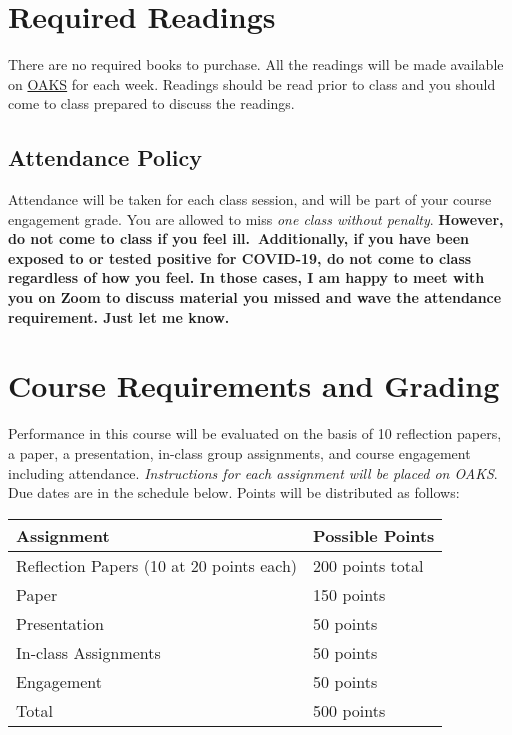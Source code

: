 \hypertarget{required-readings}{%
\section{Required Readings}\label{required-readings}}

There are no required books to purchase. All the readings will be made
available on \href{https://lms.cofc.edu}{OAKS} for each week. Readings
should be read prior to class and you should come to class prepared to
discuss the readings.

\hypertarget{attendance-policy}{%
\subsection{Attendance Policy}\label{attendance-policy}}

Attendance will be taken for each class session, and will be part of
your course engagement grade. You are allowed to miss \emph{one class
without penalty}. \textbf{However, do not come to class if you feel
ill.~Additionally, if you have been exposed to or tested positive for
COVID-19, do not come to class regardless of how you feel. In those
cases, I am happy to meet with you on Zoom to discuss material you
missed and wave the attendance requirement. Just let me know.}

\hypertarget{course-requirements-and-grading}{%
\section{Course Requirements and
Grading}\label{course-requirements-and-grading}}

Performance in this course will be evaluated on the basis of 10
reflection papers, a paper, a presentation, in-class group assignments,
and course engagement including attendance. \emph{Instructions for each
assignment will be placed on OAKS}. Due dates are in the schedule below.
Points will be distributed as follows:

\vspace{0.10in}
\begin{tabular}{ l l}
\hline
Assignment & Possible Points \\
\hline 
Reflection Papers (10 at 20 points each) & 200 points total \\
Paper & 150 points \\
Presentation & 50 points \\
In-class Assignments & 50 points \\
Engagement & 50 points \\ 
\hline
Total & 500 points \\
\hline
\end{tabular}


